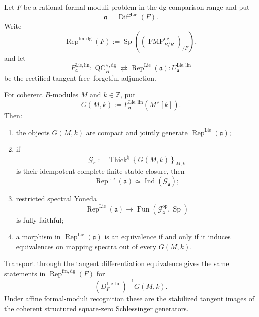 \begin{lemma}
\label{lem:as-stable-square-zero-detection}
Let $F$ be a rational formal-moduli problem in the dg comparison range and put
\[
    \mathfrak a=\operatorname{Diff}^{\mathrm{Lie}}(F).
\]
Write
\[
    \operatorname{Rep}^{\mathrm{fm,dg}}(F)
    :=
    \operatorname{Sp}
    \left(
        (\operatorname{FMP}^{\mathrm{dg}}_{B/R})_{/F}
    \right),
\]
and let
\[
    F_{\mathfrak a}^{\mathrm{Lie,lin}}:
    \operatorname{QC}^{\vee,\mathrm{dg}}_B
    \rightleftarrows
    \operatorname{Rep}^{\mathrm{Lie}}(\mathfrak a):
    U_{\mathfrak a}^{\mathrm{Lie,lin}}
\]
be the rectified tangent free--forgetful adjunction.

For coherent $B$-modules $M$ and $k\in\mathbb Z$, put
\[
    G(M,k)
    :=
    F_{\mathfrak a}^{\mathrm{Lie,lin}}(M^\vee[k]).
\]
Then:

\begin{enumerate}
    \item the objects $G(M,k)$ are compact and jointly generate
    $\operatorname{Rep}^{\mathrm{Lie}}(\mathfrak a)$;

    \item if
    \[
        \mathcal G_{\mathfrak a}
        :=
        \operatorname{Thick}^{\natural}
        \left\{
            G(M,k)
        \right\}_{M,k}
    \]
    is their idempotent-complete finite stable closure, then
    \[
    \boxed{
        \operatorname{Rep}^{\mathrm{Lie}}(\mathfrak a)
        \simeq
        \operatorname{Ind}(\mathcal G_{\mathfrak a});
    }
    \]

    \item restricted spectral Yoneda
    \[
    \boxed{
        \operatorname{Rep}^{\mathrm{Lie}}(\mathfrak a)
        \longrightarrow
        \operatorname{Fun}
        \left(
            \mathcal G_{\mathfrak a}^{\mathrm{op}},
            \operatorname{Sp}
        \right)
    }
    \]
    is fully faithful;

    \item a morphism in $\operatorname{Rep}^{\mathrm{Lie}}(\mathfrak a)$ is an
    equivalence if and only if it induces equivalences on mapping spectra out
    of every $G(M,k)$.
\end{enumerate}

Transport through the tangent differentiation equivalence gives the same
statements in $\operatorname{Rep}^{\mathrm{fm,dg}}(F)$ for
\[
\boxed{
    \left(D_F^{\mathrm{Lie,lin}}\right)^{-1}G(M,k).
}
\]
Under affine formal-moduli recognition these are the stabilized tangent
images of the coherent structured square-zero Schlessinger generators.
\end{lemma}

